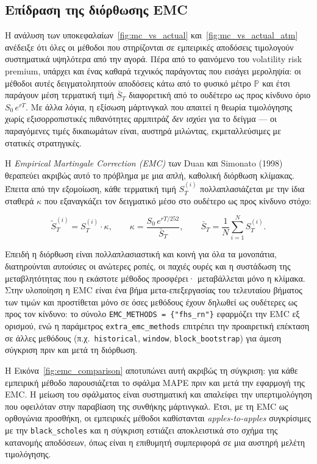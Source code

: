 \documentclass[12pt]{article}
\begin{document}
\subsection{Επίδραση της διόρθωσης EMC}

Η ανάλυση των υποκεφαλαίων~\ref{fig:mc_vs_actual} και~\ref{fig:mc_vs_actual_atm} ανέδειξε ότι όλες οι μέθοδοι που στηρίζονται σε εμπειρικές αποδόσεις τιμολογούν συστηματικά υψηλότερα από την αγορά. Πέρα από το φαινόμενο του volatility risk premium, υπάρχει και ένας καθαρά τεχνικός παράγοντας που εισάγει μεροληψία: οι μέθοδοι αυτές δειγματοληπτούν αποδόσεις κάτω από το φυσικό μέτρο $\mathbb{P}$ και έτσι παράγουν μέση τερματική τιμή $\bar S_T$ διαφορετική από το ουδέτερο ως προς κίνδυνο όριο $S_0\,e^{rT}$. Με άλλα λόγια, η εξίσωση μάρτινγκαλ που απαιτεί η θεωρία τιμολόγησης χωρίς εξισορροπιστικές πιθανότητες αρμπιτράζ \emph{δεν ισχύει} για το δείγμα — οι παραγόμενες τιμές δικαιωμάτων είναι, αυστηρά μιλώντας, εκμεταλλεύσιμες με στατικές στρατηγικές.

Η \emph{Empirical Martingale Correction (EMC)} των Duan και Simonato (1998) θεραπεύει ακριβώς αυτό το πρόβλημα με μια απλή, καθολική διόρθωση κλίμακας. Έπειτα από την εξομοίωση, κάθε τερματική τιμή $S_T^{(i)}$ πολλαπλασιάζεται με την ίδια σταθερά $\kappa$ που εξαναγκάζει τον δειγματικό μέσο στο ουδέτερο ως προς κίνδυνο στόχο:

$$
\tilde S_T^{(i)} = S_T^{(i)} \cdot \kappa, \qquad \kappa = \frac{S_0\,e^{rT/252}}{\bar S_T}, \qquad \bar S_T = \frac{1}{N}\sum_{i=1}^N S_T^{(i)}.
$$

Επειδή η διόρθωση είναι πολλαπλασιαστική και κοινή για όλα τα μονοπάτια, διατηρούνται \emph{αυτούσιες} οι ανώτερες ροπές, οι παχιές ουρές και η συστάδωση της μεταβλητότητας που η εκάστοτε μέθοδος προσφέρει· μεταβάλλεται μόνο η κλίμακα. Στην υλοποίηση η EMC είναι ένα βήμα μετα-επεξεργασίας του τελευταίου βήματος των τιμών και προστίθεται μόνο σε όσες μεθόδους έχουν δηλωθεί ως ουδέτερες ως προς τον κίνδυνο: το σύνολο \texttt{EMC\_METHODS = \{"fhs\_rn"\}} εφαρμόζει την EMC εξ ορισμού, ενώ η παράμετρος \texttt{extra\_emc\_methods} επιτρέπει την προαιρετική επέκταση σε άλλες μεθόδους (π.χ.\ \texttt{historical}, \texttt{window}, \texttt{block\_bootstrap}) για άμεση σύγκριση πριν και μετά τη διόρθωση.

Η Εικόνα~\ref{fig:emc_comparison} αποτυπώνει αυτή ακριβώς τη σύγκριση: για κάθε εμπειρική μέθοδο παρουσιάζεται το σφάλμα MAPE πριν και μετά την εφαρμογή της EMC. Η μείωση του σφάλματος είναι συστηματική και απαλείφει την υπερτιμολόγηση που οφειλόταν στην παραβίαση της συνθήκης μάρτινγκαλ. Έτσι, με τη EMC ως ορθογώνια προσθήκη, οι εμπειρικές μέθοδοι καθίστανται \emph{apples-to-apples} συγκρίσιμες με την \texttt{black\_scholes} και η σύγκριση εστιάζει αποκλειστικά στο σχήμα της κατανομής αποδόσεων, όπως είναι η επιθυμητή συμπεριφορά σε μια αυστηρή μελέτη τιμολόγησης.
\end{document}
